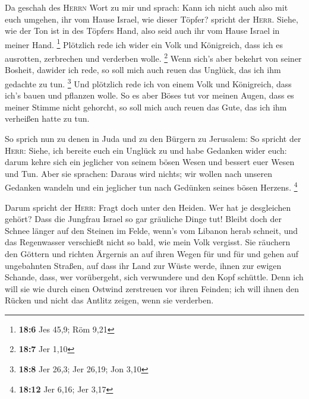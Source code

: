  Da geschah des \textsc{Herrn} Wort zu mir und sprach:
 Kann ich nicht auch also mit euch umgehen, ihr vom Hause
Israel, wie dieser Töpfer? spricht der \textsc{Herr}. Siehe, wie der Ton
ist in des Töpfers Hand, also seid auch ihr vom Hause Israel in meiner
Hand. \footnote{\textbf{18:6} Jes 45,9; Röm 9,21} 
Plötzlich rede ich wider ein Volk und Königreich, dass ich es ausrotten,
zerbrechen und verderben wolle. \footnote{\textbf{18:7} Jer 1,10}
 Wenn sich's aber bekehrt von seiner Bosheit, dawider ich
rede, so soll mich auch reuen das Unglück, das ich ihm gedachte zu tun.
\footnote{\textbf{18:8} Jer 26,3; Jer 26,19; Jon 3,10} 
Und plötzlich rede ich von einem Volk und Königreich, dass ich's bauen
und pflanzen wolle.  So es aber Böses tut vor meinen
Augen, dass es meiner Stimme nicht gehorcht, so soll mich auch reuen das
Gute, das ich ihm verheißen hatte zu tun.

 So sprich nun zu denen in Juda und zu den Bürgern zu
Jerusalem: So spricht der \textsc{Herr}: Siehe, ich bereite euch ein
Unglück zu und habe Gedanken wider euch: darum kehre sich ein jeglicher
von seinem bösen Wesen und bessert euer Wesen und Tun. 
Aber sie sprachen: Daraus wird nichts; wir wollen nach unseren Gedanken
wandeln und ein jeglicher tun nach Gedünken seines bösen Herzens.
\footnote{\textbf{18:12} Jer 6,16; Jer 3,17}

 Darum spricht der \textsc{Herr}: Fragt doch unter den
Heiden. Wer hat je desgleichen gehört? Dass die Jungfrau Israel so gar
gräuliche Dinge tut!  Bleibt doch der Schnee länger auf
den Steinen im Felde, wenn's vom Libanon herab schneit, und das
Regenwasser verschießt nicht so bald, wie mein Volk vergisst.
 Sie räuchern den Göttern und richten Ärgernis an auf
ihren Wegen für und für und gehen auf ungebahnten Straßen,
 auf dass ihr Land zur Wüste werde, ihnen zur ewigen
Schande, dass, wer vorübergeht, sich verwundere und den Kopf schüttle.
 Denn ich will sie wie durch einen Ostwind zerstreuen vor
ihren Feinden; ich will ihnen den Rücken und nicht das Antlitz zeigen,
wenn sie verderben.

